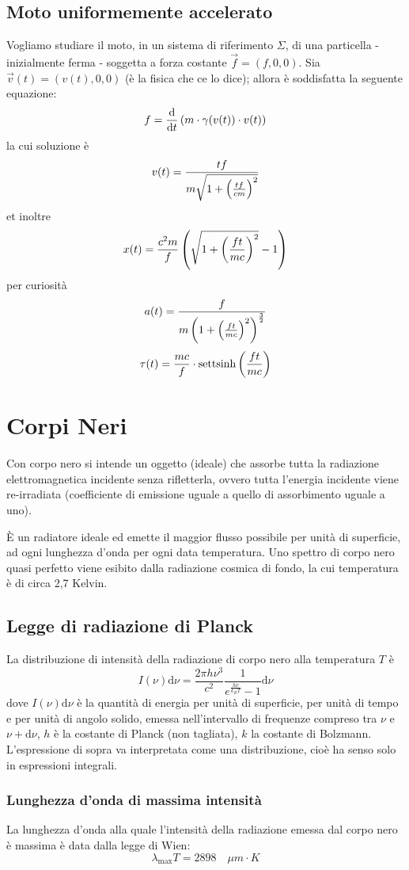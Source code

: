 \documentclass[10pt,a4paper]{article}
\newcommand{\de}{{\ensuremath{ \mbox{d}}}}
\begin{document}
\begin{multicols}{2}
  \subsection*{Moto uniformemente accelerato}
  Vogliamo studiare il moto, in un sistema di riferimento $\Sigma$, di una particella - inizialmente ferma - soggetta a forza costante $\vec f = (f, 0, 0)$. Sia $\vec v(t) = (v(t), 0, 0)$ (è la fisica che ce lo dice); allora è soddisfatta la seguente equazione:
  $$ f = \ded{}{t} \lrt{m \cdot \gamma(v(t)) \cdot v(t)} $$
  la cui soluzione è
  $$ v(t) = \frac{t f}{m \sqrt{1 + \left({\frac{t f}{cm}}\right)^2}} $$
  et inoltre
  $$ x(t) = \frac{c^2 m}{f} \left({\sqrt{1 + \left({\frac{ft}{mc}}\right)^2} - 1}\right) $$
  per curiosità
  $$ a(t) = \frac{f}{m \left({1 + \left({\frac{ft}{mc}}\right)^2}\right)^{\frac{3}{2}}} $$
  $$ \tau(t) = \frac{mc}{f} \cdot \text{settsinh}\left({\frac{ft}{mc}}\right) $$

  \clearpage
  \section*{Corpi Neri}
  Con corpo nero si intende un oggetto (ideale) che assorbe tutta la radiazione elettromagnetica incidente senza rifletterla, ovvero tutta l'energia incidente viene re-irradiata (coefficiente di emissione uguale a quello di assorbimento uguale a uno).

  È un radiatore ideale ed emette il maggior flusso possibile per unità di superficie, ad ogni lunghezza d'onda per ogni data temperatura. Uno spettro di corpo nero quasi perfetto viene esibito dalla radiazione cosmica di fondo, la cui temperatura è di circa 2,7 Kelvin.

  \subsection*{Legge di radiazione di Planck}
  La distribuzione di intensità della radiazione di corpo nero alla temperatura $T$ è
  $$ I(\nu) \de \nu = \frac{2 \pi h \nu^3}{c^2} \frac{1}{e^{\frac{h\nu}{k_B T}} - 1} \de \nu $$
  dove $I(\nu) \de \nu$ è la quantità di energia per unità di superficie, per unità di tempo e per unità di angolo solido, emessa nell'intervallo di frequenze compreso tra $\nu$ e $\nu + \de \nu$, $h$ è la costante di Planck (non tagliata), $k$ la costante di Bolzmann. L'espressione di sopra va interpretata come una distribuzione, cioè ha senso solo in espressioni integrali.

  \subsubsection*{Lunghezza d'onda di massima intensità}
  La lunghezza d'onda alla quale l'intensità della radiazione emessa dal corpo nero è massima è data dalla legge di Wien:
  $$ \lambda_\text{max} T = 2898 \quad \mu m \cdot K $$


\end{multicols}
\end{document}
